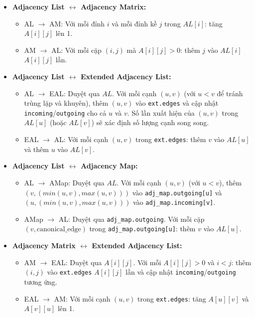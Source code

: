 \documentclass{article}
\begin{document}
\begin{itemize}
    \item \textbf{Adjacency List $\leftrightarrow$ Adjacency Matrix:}
    \begin{itemize}
        \item AL $\to$ AM: Với mỗi đỉnh $i$ và mỗi đỉnh kề $j$ trong $AL[i]$: tăng $A[i][j]$ lên 1.
        \item AM $\to$ AL: Với mỗi cặp $(i,j)$ mà $A[i][j] > 0$: thêm $j$ vào $AL[i]$ $A[i][j]$ lần.
    \end{itemize}
    \item \textbf{Adjacency List $\leftrightarrow$ Extended Adjacency List:}
    \begin{itemize}
        \item AL $\to$ EAL: Duyệt qua $AL$. Với mỗi cạnh $(u,v)$ (với $u < v$ để tránh trùng lặp và khuyên), thêm $(u,v)$ vào \texttt{ext.edges} và cập nhật \texttt{incoming}/\texttt{outgoing} cho cả $u$ và $v$. Số lần xuất hiện của $(u,v)$ trong $AL[u]$ (hoặc $AL[v]$) sẽ xác định số lượng cạnh song song.
        \item EAL $\to$ AL: Với mỗi cạnh $(u,v)$ trong \texttt{ext.edges}: thêm $v$ vào $AL[u]$ và thêm $u$ vào $AL[v]$.
    \end{itemize}
    \item \textbf{Adjacency List $\leftrightarrow$ Adjacency Map:}
    \begin{itemize}
        \item AL $\to$ AMap: Duyệt qua $AL$. Với mỗi cạnh $(u,v)$ (với $u < v$), thêm $(v, (min(u,v), max(u,v)))$ vào \texttt{adj\_map.outgoing[u]} và $(u, (min(u,v), max(u,v)))$ vào \texttt{adj\_map.incoming[v]}.
        \item AMap $\to$ AL: Duyệt qua \texttt{adj\_map.outgoing}. Với mỗi cặp $(v, \text{canonical\_edge})$ trong \texttt{adj\_map.outgoing[u]}: thêm $v$ vào $AL[u]$.
    \end{itemize}
    \item \textbf{Adjacency Matrix $\leftrightarrow$ Extended Adjacency List:}
    \begin{itemize}
        \item AM $\to$ EAL: Duyệt qua $A[i][j]$. Với mỗi $A[i][j] > 0$ và $i < j$: thêm $(i,j)$ vào \texttt{ext.edges} $A[i][j]$ lần và cập nhật \texttt{incoming}/\texttt{outgoing} tương ứng.
        \item EAL $\to$ AM: Với mỗi cạnh $(u,v)$ trong \texttt{ext.edges}: tăng $A[u][v]$ và $A[v][u]$ lên 1.
    \end{itemize}

\end{itemize}
\end{document}
